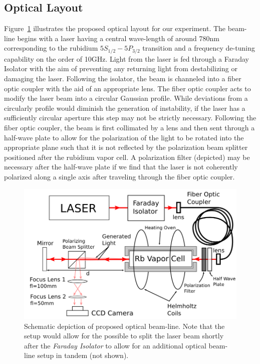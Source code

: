 \documentclass[aps,twocolumn,secnumarabic,balancelastpage,amsmath,amssymb,nofootinbib]{revtex4}
\begin{document}
\subsection*{Optical Layout}
Figure~\ref{fig:layout} illustrates the proposed optical layout for our experiment. The beam-line begins with a laser having a central wave-length of around 780nm corresponding to the rubidium $5S_{1/2}-5P_{3/2}$ transition and a frequency de-tuning capability on the order of 10GHz. Light from the laser is fed through a Faraday Isolator with the aim of preventing any returning light from destabilizing or damaging the laser. Following the isolator, the beam is channeled into a fiber optic coupler with the aid of an appropriate lens. The fiber optic coupler acts to modify the laser beam into a circular Gaussian profile. While deviations from a circularly profile would diminish the generation of instability, if the laser has a sufficiently circular aperture this step may not be strictly necessary. Following the fiber optic coupler, the beam is first collimated by a lens and then sent through a half-wave plate to allow for the polarization of the light to be rotated into the appropriate plane such that it is not reflected by the polarization beam splitter positioned after the rubidium vapor cell. A polarization filter (depicted) may be necessary after the half-wave plate if we find that the laser is not coherently polarized along a single axis after traveling through the fiber optic coupler. 

\begin{figure}[h!]
\includegraphics[width=0.9\linewidth]{drawing.png}
\caption{\label{fig:layout} Schematic depiction of proposed optical beam-line. Note that the setup would allow for the possible to split the laser beam shortly after the \textit{Faraday Isolator} to allow for an additional optical beam-line setup in tandem (not shown).}
\end{figure}
\end{document}
